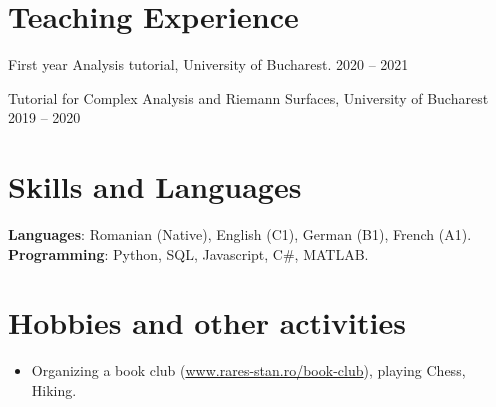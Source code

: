 \documentclass[a4paper, 11pt]{article}
\begin{document}
\section{Teaching Experience}
\begin{itemize}[leftmargin=0.5cm]
		{\item{
			First year Analysis tutorial, University of Bucharest.
			\hfill
			2020 -- 2021
	}}
	{\item{
			Tutorial for Complex Analysis and Riemann Surfaces, University of Bucharest
			\hfill
			2019 -- 2020
	}}
\end{itemize}
 
\section{Skills and Languages}
\begin{itemize}[leftmargin=0.5cm, label={}]
	{\item{
			\textbf{Languages}{: Romanian (Native), English (C1), German (B1), French (A1).} \\
			\textbf{Programming}{: Python, SQL, Javascript, C\#, MATLAB.}
	}}
\end{itemize}

\section{Hobbies and other activities}
\begin{itemize}[leftmargin=0.5cm, label={}]
\item{
Organizing a book club (\href{https://www.rares-stan.ro/book-club}{www.rares-stan.ro/book-club}), playing Chess, Hiking.}
\end{itemize}
 
    
\end{document}
